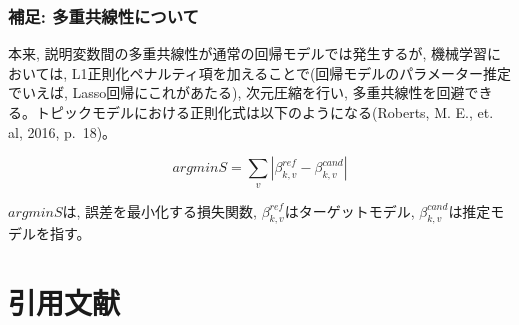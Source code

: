 \documentclass[
]{article}
\begin{document}
\hypertarget{ux88dcux8db3-ux591aux91cdux5171ux7ddaux6027ux306bux3064ux3044ux3066}{%
\subsubsection{補足:
多重共線性について}\label{ux88dcux8db3-ux591aux91cdux5171ux7ddaux6027ux306bux3064ux3044ux3066}}

本来, 説明変数間の多重共線性が通常の回帰モデルでは発生するが,
機械学習においては,
L1正則化ペナルティ項を加えることで(回帰モデルのパラメーター推定でいえば,
Lasso回帰にこれがあたる), 次元圧縮を行い,
多重共線性を回避できる。トピックモデルにおける正則化式は以下のようになる(Roberts,
M. E., et. al, 2016, p.~18)。

\[argminS= ∑_v| β_{k,v}^{ref}  -  β_{k,v}^{cand} |\]

\(argminS\)は, 誤差を最小化する損失関数,
\(β_{k,v}^{ref}\)はターゲットモデル,
\(β_{k,v}^{cand}\)は推定モデルを指す。

\hypertarget{ux5f15ux7528ux6587ux732e}{%
\section{引用文献}\label{ux5f15ux7528ux6587ux732e}}
\end{document}
